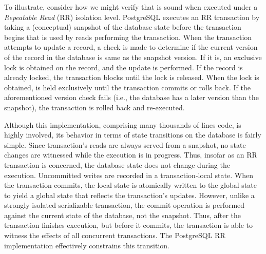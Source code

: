 To illustrate, consider how we might verify that  is
sound when executed under a \emph{Repeatable Read} (RR) isolation
level.  PostgreSQL executes an RR transaction by taking a
(conceptual) snapshot of the database state before the transaction
begins that is used by reads performing the transaction.  When the
transaction attempts to update a record, a check is made to determine
if the current version of the record in the database is same as the
snapshot version. If it is, an exclusive lock is obtained on the
record, and the update is performed. If the record is already locked,
the transaction blocks until the lock is released.  When the lock is
obtained, is held exclusively until the transaction commits or rolls
back. If the aforementioned version check fails (i.e., the database
has a later version than the snapshot), the transaction is rolled back
and re-executed.

Although this implementation, comprising many thousands of lines code,
is highly involved, its behavior in terms of state transitions on the
database is fairly simple.  Since transaction's reads are always
served from a snapshot, no state changes are witnessed while the
execution is in progress. Thus, insofar as an RR transaction is
concerned, the database state does not change during the execution.
Uncommitted writes are recorded in a transaction-local state.  When
the transaction commits, the local state is atomically written to the
global state to yield a global state that reflects the transaction's
updates.  However, unlike a strongly isolated serializable
transaction, the commit operation is performed against the current
state of the database, not the snapshot. Thus, after the transaction
finishes execution, but before it commits, the transaction is able to
witness the effects of all concurrent transactions.  The PostgreSQL RR
implementation effectively constrains this transition.

